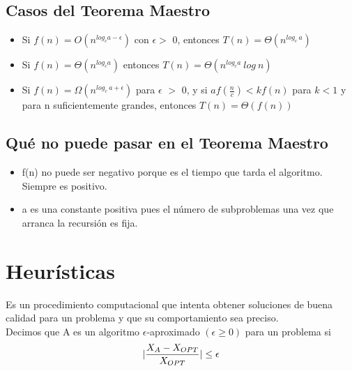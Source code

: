 \documentclass[10pt,a4paper]{article}
\begin{document}
\subsection*{Casos del Teorema Maestro}
\begin{itemize}
    \item Si $f(n) = O(n^{log_{c} a-\epsilon})$ con $\epsilon >$ 0, entonces $T(n) = \Theta(n^{log_{c} \ a})$
    \item Si $f(n) = \Theta(n^{log_{c} a})$ entonces $T(n) = \Theta(n^{log_{c} a} \ log \ n)$
    \item Si $f(n) = \Omega(n^{log_{c} \ a + \epsilon})$ para $\epsilon$ $>$ 0, y si $ af(\frac{n}{c}) < kf(n)$ para $k<1$ y para n suficientemente grandes, entonces $T(n) = \Theta(f(n))$
\end{itemize}
\subsection*{Qué no puede pasar en el Teorema Maestro}
\begin{itemize}
    \item f(n) no puede ser negativo porque es el tiempo que tarda el algoritmo. Siempre es positivo.
    \item a es una constante positiva pues el número de subproblemas una vez que arranca la recursión es fija.
\end{itemize}
\section*{Heurísticas}
Es un procedimiento computacional que intenta obtener soluciones de buena calidad para un problema y que su comportamiento sea preciso. \\
Decimos que A es un algoritmo $\epsilon$-aproximado $(\epsilon \ge 0)$ para un problema si \[|\frac{X_{A} - X_{OPT}}{X_{OPT}}| \le \epsilon\]
\end{document}
